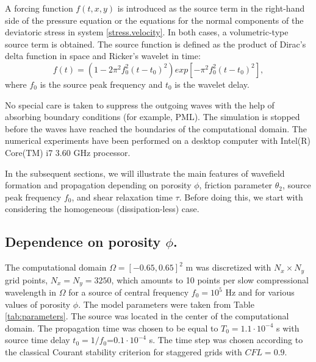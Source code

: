 \documentclass[3p,times,table]{article}
\begin{document}
A forcing function $f(t,x,y)$ is introduced as the source term in the 
right-hand side of the pressure equation or the equations for the normal components 
of 
the deviatoric stress in system \eqref{stress.velocity}. In both cases, a 
volumetric-type source term is obtained. The source function is 
defined as the product of Dirac's delta function in space and Ricker's wavelet in time: 
\begin{equation}
f(t)=(1-2\pi ^{2} f_{0}^{2}(t-t_{0})^{2})exp[-\pi ^{2}f_{0}^{2}(t-t_{0})^{2}],
\end{equation}
where $f_{0}$ is the source peak frequency and $t_{0}$ is the wavelet delay.

No special care is taken to suppress the  outgoing waves with the help of absorbing boundary conditions (for example, PML). The simulation is stopped before the waves have reached the boundaries of the computational domain. 
The numerical experiments have been performed on a desktop computer with Intel(R) 
Core(TM) i7 3.60 GHz processor.

In the subsequent sections, we  will illustrate the main features of  
wavefield formation and propagation depending on porosity $\phi$, 
friction parameter $\theta_2$, source peak frequency $f_{0}$, and  shear relaxation time $\tau$. Before doing 
this, we start with considering the homogeneous (dissipation-less) case.

\subsection{Dependence on  porosity $\phi$.}

The computational domain $\Omega =[-0.65, 0.65]^{2}$  m was discretized with 
$ N_x \times N_y$ grid points, $N_x = N_y = 3250$, which amounts to 10 points 
per 
slow 
compressional wavelength in $\Omega$ for a source of central frequency 
$f_0=10^{5} $ Hz  and for various values of porosity $\phi$. The model 
parameters were taken from Table\,\ref{tab:parameters}. The source was located 
in the center of the computational 
domain. The propagation time was chosen to be equal to $T_{0}= 1.1\cdot10^{-4}$ s  with 
 source time delay $t_{0}=1/f_{0}$=$ 0.1\cdot10^{-4}$ s. 
The time step was chosen according to 
the classical Courant stability criterion for staggered grids with $CFL = 0.9$. 
\end{document}

